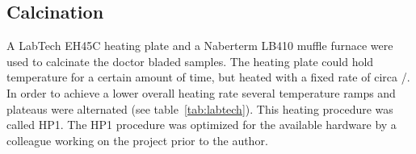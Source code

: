 \subsection{Calcination}\label{sec:exp-calc}
A LabTech EH45C heating plate and a Naberterm LB410 muffle furnace were used to calcinate 
the doctor bladed samples. 
The heating plate could hold temperature for a certain amount of time, but heated with a 
fixed rate of circa /\minutes{}.
In order to achieve a lower overall heating rate several temperature ramps and plateaus 
were alternated (see table~\ref{tab:labtech}). %
This heating procedure was called HP1.
The HP1 procedure was optimized for the available hardware by a colleague working on the 
project prior to the author.

